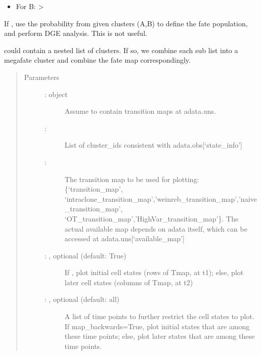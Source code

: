 \documentclass[letterpaper,10pt,english]{sphinxmanual}
\begin{document}
\begin{fulllineitems}
\begin{itemize}
\item {} 
For B:  \textgreater{} 

\end{itemize}

If , use the probability from given clusters (A,B)
to define the fate population, and perform DGE analysis. This is not useful.

 could contain a nested list of clusters. If so, we
combine each sub list into a mega\sphinxhyphen{}fate cluster and combine the fate
map correspondingly.
\begin{quote}\begin{description}
\item[{Parameters}] \leavevmode\begin{description}
\item[{ :  object}] \leavevmode
Assume to contain transition maps at adata.uns.

\item[{ : }] \leavevmode
List of cluster\_ids consistent with adata.obs{[}‘state\_info’{]}

\item[{ : }] \leavevmode
The transition map to be used for plotting: \{‘transition\_map’,
‘intraclone\_transition\_map’,’weinreb\_transition\_map’,’naive\_transition\_map’,
‘OT\_transition\_map’,’HighVar\_transition\_map’\}. The actual available
map depends on adata itself, which can be accessed at adata.uns{[}‘available\_map’{]}

\item[{ : , optional (default: True)}] \leavevmode
If , plot initial cell states (rows of Tmap, at t1);
else, plot later cell states (columns of Tmap, at t2)

\item[{ : , optional (default: all)}] \leavevmode
A list of time points to further restrict the cell states to plot.
If map\_backwards=True, plot initial states that are among these time points;
else, plot later states that are among these time points.


\end{description}
\end{description}
\end{quote}
\end{fulllineitems}
\end{document}
